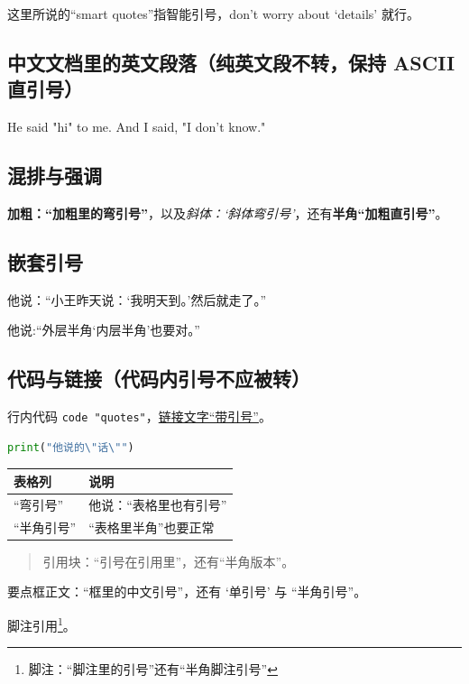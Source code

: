 \documentclass[zihao=-4]{ctexart}
\numberwithin{equation}{section}
\numberwithin{figure}{section}
\numberwithin{table}{section}
\theoremstyle{plain}
\begin{document}
这里所说的“smart quotes”指智能引号，don't worry about ‘details’ 就行。

\subsection{中文文档里的英文段落（纯英文段不转，保持 ASCII 直引号）}

He said "hi" to me. And I said, "I don't know."

\subsection{混排与强调}

\textbf{加粗：“加粗里的弯引号”}，以及\emph{斜体：‘斜体弯引号’}，还有\textbf{半角“加粗直引号”}。

\subsection{嵌套引号}

他说：“小王昨天说：‘我明天到。’然后就走了。”

他说:“外层半角‘内层半角’也要对。”

\subsection{代码与链接（代码内引号不应被转）}

行内代码 \texttt{code "quotes"}，\href{https://example.com/x}{链接文字“带引号”}。

\noindent \begin{lstlisting}[language=Python]
print("他说的\"话\"")
\end{lstlisting}

\noindent \begin{tabular}{ll}
\toprule
表格列 & 说明 \\
\midrule
“弯引号” & 他说：“表格里也有引号” \\
“半角引号” & “表格里半角”也要正常 \\
\bottomrule
\end{tabular}

\begin{quote}
引用块：“引号在引用里”，还有“半角版本”。
\end{quote}

\begin{tipbox}[要点框标题]
要点框正文：“框里的中文引号”，还有 ‘单引号’ 与 “半角引号”。
\end{tipbox}

脚注引用\footnote{脚注：“脚注里的引号”还有“半角脚注引号”}。
\end{document}
